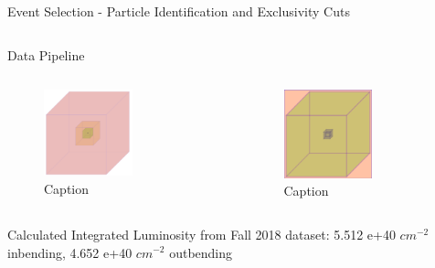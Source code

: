 \documentclass[aspectratio=169]{beamer}
\begin{document}
\begin{frame}{Event Selection - Particle Identification and Exclusivity Cuts}
\begin{columns}[c]
\begin{column}{0.65\textwidth}
\begin{columns}[t, onlytextwidth]
                	


        \end{columns}
        \end{column}   
        \end{columns}
\end{frame}

\begin{frame}{Data Pipeline}

        
        \begin{columns}
                                
    
                \begin{figure}
                    \centering
                    \includegraphics[width=0.6\textwidth]{defense/box1.png}
                    \caption{Caption}
                    \label{fig:enter-label}
                \end{figure}
                \begin{figure}
                    \centering
                    \includegraphics[width=0.6\textwidth]{defense/box2.png}
                    \caption{Caption}
                    \label{fig:enter-label}
                \end{figure}
                
        \end{columns}
       Calculated Integrated Luminosity from Fall 2018  dataset: 5.512 e+40 $cm^{-2}$ inbending, 4.652 e+40 $cm^{-2}$ outbending
\end{frame} 
\end{document}
